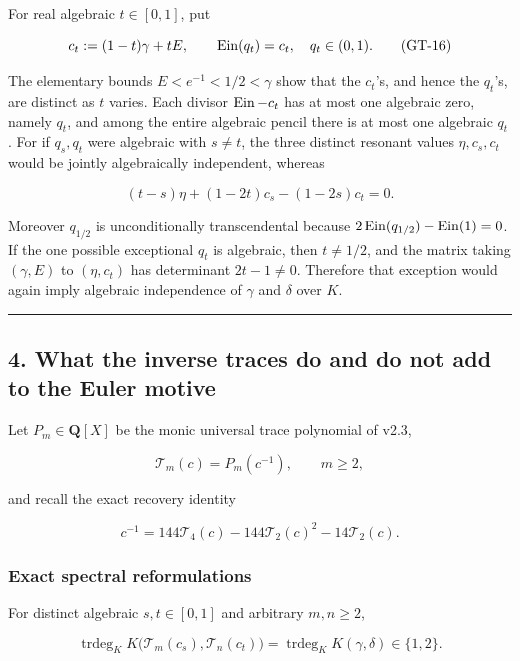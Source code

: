 For real algebraic \(t\in[0,1]\), put

\[
 c_t:=(1-t)\gamma+tE,
 \qquad \operatorname{Ein}(q_t)=c_t,\quad q_t\in(0,1).                                    \tag{GT-16}
\]

The elementary bounds \(E<e^{-1}<1/2<\gamma\) show that the \(c_t\)'s,
and hence the \(q_t\)'s, are distinct as \(t\) varies. Each divisor
\(\operatorname{Ein}-c_t\) has at most one algebraic zero, namely \(q_t\), and among the
entire algebraic pencil there is at most one algebraic \(q_t\). For if
\(q_s,q_t\) were algebraic with \(s\ne t\), the three distinct resonant
values \(\eta,c_s,c_t\) would be jointly algebraically independent, whereas

\[
 (t-s)\eta+(1-2t)c_s-(1-2s)c_t=0.                                          \tag{GT-17}
\]

Moreover \(q_{1/2}\) is unconditionally transcendental because
\(2\operatorname{Ein}(q_{1/2})-\operatorname{Ein}(1)=0\). If the one possible exceptional \(q_t\) is
algebraic, then \(t\ne1/2\), and the matrix taking
\((\gamma,E)\) to \((\eta,c_t)\) has determinant \(2t-1\ne0\). Therefore
that exception would again imply algebraic independence of \(\gamma\) and
\(\delta\) over \(K\).

\begin{center}\rule{0.5\linewidth}{0.5pt}\end{center}

\subsection{4. What the inverse traces do and do not add to the Euler motive}

Let \(P_m\in\mathbf Q[X]\) be the monic universal trace polynomial of v2.3,

\[
 \mathcal T_m(c)=P_m(c^{-1}),\qquad m\ge2,
\]

and recall the exact recovery identity

\[
 c^{-1}=144\mathcal T_4(c)-144\mathcal T_2(c)^2-14\mathcal T_2(c).          \tag{GT-18}
\]

\subsubsection{Exact spectral reformulations}

For distinct algebraic \(s,t\in[0,1]\) and arbitrary \(m,n\ge2\),

\[
 \boxed{
 \operatorname{trdeg}_K
 K\bigl(\mathcal T_m(c_s),\mathcal T_n(c_t)\bigr)
 =\operatorname{trdeg}_K K(\gamma,\delta)\in\{1,2\}.}                     \tag{GT-19}
\]

